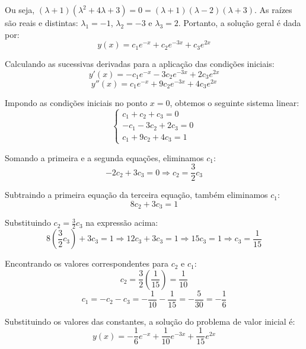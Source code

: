 \documentclass[oneside,12pt,a4paper]{report}
\begin{document}
\begin{resolucao}
    Ou seja, $(\lambda+1)(\lambda^2+4\lambda+3)=0=(\lambda+1)(\lambda-2)(\lambda+3)$. As raízes são reais e distintas: $\lambda_1 = -1$, $\lambda_2 = -3$ e $\lambda_3 = 2$. Portanto, a solução geral é dada por:
    \[y(x) = c_1 e^{-x} + c_2 e^{-3x} + c_3 e^{2x}\]

    Calculando as sucessivas derivadas para a aplicação das condições iniciais:
    \[y'(x) = -c_1 e^{-x} - 3c_2 e^{-3x} + 2c_3 e^{2x}\]
    \[y''(x) = c_1 e^{-x} + 9c_2 e^{-3x} + 4c_3 e^{2x}\]

    Impondo as condições iniciais no ponto $x = 0$, obtemos o seguinte sistema linear:
    \[\begin{cases}
        c_1 + c_2 + c_3 = 0 \\
        -c_1 - 3c_2 + 2c_3 = 0 \\
        c_1 + 9c_2 + 4c_3 = 1
    \end{cases}\]

    Somando a primeira e a segunda equações, eliminamos $c_1$:
    \[-2c_2 + 3c_3 = 0 \Rightarrow c_2 = \frac{3}{2}c_3\]

    Subtraindo a primeira equação da terceira equação, também eliminamos $c_1$:
    \[8c_2 + 3c_3 = 1\]

    Substituindo $c_2 = \frac{3}{2}c_3$ na expressão acima:
    \[8\left(\frac{3}{2}c_3\right) + 3c_3 = 1 \Rightarrow 12c_3 + 3c_3 = 1 \Rightarrow 15c_3 = 1 \Rightarrow c_3 = \frac{1}{15}\]

    Encontrando os valores correspondentes para $c_2$ e $c_1$:
    \[c_2 = \frac{3}{2}\left(\frac{1}{15}\right) = \frac{1}{10}\]
    \[c_1 = -c_2 - c_3 = -\frac{1}{10} - \frac{1}{15} = -\frac{5}{30} = -\frac{1}{6}\]

    Substituindo os valores das constantes, a solução do problema de valor inicial é:
    \[\boxed{y(x) = -\frac{1}{6}e^{-x} + \frac{1}{10}e^{-3x} + \frac{1}{15}e^{2x}}\]
\end{resolucao}
\end{document}
